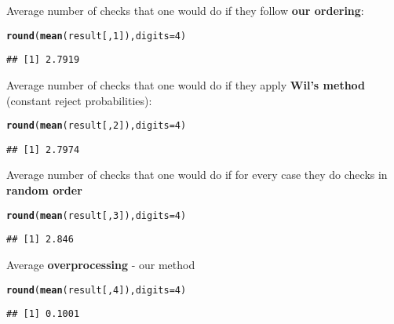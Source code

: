 \documentclass{article}\usepackage[]{graphicx}\usepackage[]{color}
\makeatletter
\newcommand{\hlnum}[1]{\textcolor[rgb]{0.686,0.059,0.569}{#1}}%
\newcommand{\hlstd}[1]{\textcolor[rgb]{0.345,0.345,0.345}{#1}}%
\newcommand{\hlkwc}[1]{\textcolor[rgb]{0.333,0.667,0.333}{#1}}%
\newcommand{\hlkwd}[1]{\textcolor[rgb]{0.737,0.353,0.396}{\textbf{#1}}}%
\newenvironment{kframe}{%
 \def\at@end@of@kframe{}%
 \ifinner\ifhmode%
  \def\at@end@of@kframe{\end{minipage}}%
  \begin{minipage}{\columnwidth}%
 \fi\fi%
 \def\FrameCommand##1{\hskip\@totalleftmargin \hskip-\fboxsep
 \colorbox{shadecolor}{##1}\hskip-\fboxsep
     \hskip-\linewidth \hskip-\@totalleftmargin \hskip\columnwidth}%
 \MakeFramed {\advance\hsize-\width
   \@totalleftmargin\z@ \linewidth\hsize
   \@setminipage}}%
 {\par\unskip\endMakeFramed%
 \at@end@of@kframe}
\newenvironment{knitrout}{}{} %
\makeatother
\begin{document}
Average number of checks that one would do if they follow \textbf{our ordering}:

\begin{knitrout}
\color{fgcolor}\begin{kframe}
\begin{alltt}
\hlkwd{round}\hlstd{(}\hlkwd{mean}\hlstd{(result[,}\hlnum{1}\hlstd{]),}\hlkwc{digits} \hlstd{=} \hlnum{4}\hlstd{)}
\end{alltt}
\begin{verbatim}
## [1] 2.7919
\end{verbatim}
\end{kframe}
\end{knitrout}

Average number of checks that one would do if they apply \textbf{Wil's method} (constant reject probabilities):

\begin{knitrout}
\color{fgcolor}\begin{kframe}
\begin{alltt}
\hlkwd{round}\hlstd{(}\hlkwd{mean}\hlstd{(result[,}\hlnum{2}\hlstd{]),}\hlkwc{digits} \hlstd{=} \hlnum{4}\hlstd{)}
\end{alltt}
\begin{verbatim}
## [1] 2.7974
\end{verbatim}
\end{kframe}
\end{knitrout}

Average number of checks that one would do if for every case they do checks in \textbf{random order}

\begin{knitrout}
\color{fgcolor}\begin{kframe}
\begin{alltt}
\hlkwd{round}\hlstd{(}\hlkwd{mean}\hlstd{(result[,}\hlnum{3}\hlstd{]),}\hlkwc{digits} \hlstd{=} \hlnum{4}\hlstd{)}
\end{alltt}
\begin{verbatim}
## [1] 2.846
\end{verbatim}
\end{kframe}
\end{knitrout}

Average \textbf{overprocessing} - our method

\begin{knitrout}
\color{fgcolor}\begin{kframe}
\begin{alltt}
\hlkwd{round}\hlstd{(}\hlkwd{mean}\hlstd{(result[,}\hlnum{4}\hlstd{]),}\hlkwc{digits} \hlstd{=} \hlnum{4}\hlstd{)}
\end{alltt}
\begin{verbatim}
## [1] 0.1001
\end{verbatim}
\end{kframe}
\end{knitrout}
\end{document}
